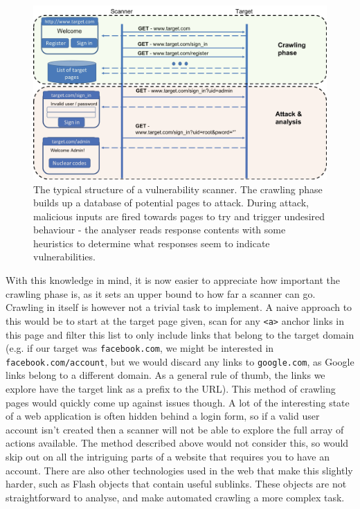 \begin{figure}[h]
	\centering
	\includegraphics[width=\textwidth]{images/scanner_structure.png}
	\caption{The typical structure of a vulnerability scanner. The crawling phase builds up a database of potential pages to attack. During attack, malicious inputs are fired towards pages to try and trigger undesired behaviour - the analyser reads response contents with some heuristics to determine what responses seem to indicate vulnerabilities.}
	\label{fig:test}
\end{figure}

With this knowledge in mind, it is now easier to appreciate how important the crawling phase is, as it sets an upper bound to how far a scanner can go. Crawling in itself is however not a trivial task to implement. A naive approach to this would be to start at the target page given, scan for any \texttt{<a>} anchor links in this page and filter this list to only include links that belong to the target domain (e.g. if our target was \texttt{facebook.com}, we might be interested in \texttt{facebook.com/account}, but we would discard any links to \texttt{google.com}, as Google links belong to a different domain. As a general rule of thumb, the links we explore have the target link as a prefix to the URL). This method of crawling pages would quickly come up against issues though. A lot of the interesting state of a web application is often hidden behind a login form, so if a valid user account isn't created then a scanner will not be able to explore the full array of actions available. The method described above would not consider this, so would skip out on all the intriguing parts of a website that requires you to have an account. There are also other technologies used in the web that make this slightly harder, such as Flash objects that contain useful sublinks. These objects are not straightforward to analyse, and make automated crawling a more complex task. \\

